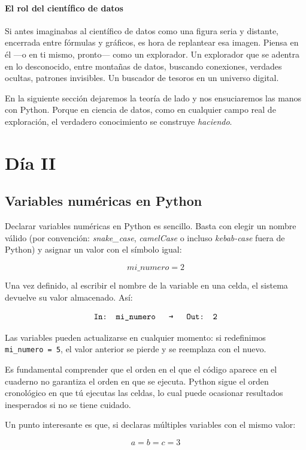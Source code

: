 \documentclass{article}
\theoremstyle{nonumberplain}
\begin{document}
\paragraph{El rol del científico de datos}

Si antes imaginabas al científico de datos como una figura seria y distante, encerrada entre fórmulas y gráficos, es hora de replantear esa imagen. Piensa en él —o en ti mismo, pronto— como un explorador. Un explorador que se adentra en lo desconocido, entre montañas de datos, buscando conexiones, verdades ocultas, patrones invisibles. Un buscador de tesoros en un universo digital.

En la siguiente sección dejaremos la teoría de lado y nos ensuciaremos las manos con Python. Porque en ciencia de datos, como en cualquier campo real de exploración, el verdadero conocimiento se construye \textit{haciendo}.

\section*{Día II}
\subsection*{Variables numéricas en Python}

Declarar variables numéricas en Python es sencillo. Basta con elegir un nombre válido (por convención: \textit{snake\_case}, \textit{camelCase} o incluso \textit{kebab-case} fuera de Python) y asignar un valor con el símbolo igual:

\[
mi\_numero = 2
\]

Una vez definido, al escribir el nombre de la variable en una celda, el sistema devuelve su valor almacenado. Así:

\[
\texttt{In: mi\_numero \quad → \quad Out: 2}
\]

Las variables pueden actualizarse en cualquier momento: si redefinimos \texttt{mi\_numero = 5}, el valor anterior se pierde y se reemplaza con el nuevo.

Es fundamental comprender que el orden en el que el código aparece en el cuaderno no garantiza el orden en que se ejecuta. Python sigue el orden cronológico en que tú ejecutas las celdas, lo cual puede ocasionar resultados inesperados si no se tiene cuidado.

Un punto interesante es que, si declaras múltiples variables con el mismo valor:

\[
a = b = c = 3
\]
\end{document}
